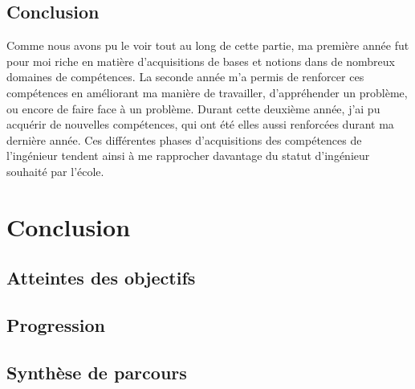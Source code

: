 \documentclass[12pt,a4paper]{report}
\begin{document}
\subsection{Conclusion}
Comme nous avons pu le voir tout au long de cette partie, ma première année fut pour moi riche en matière d'acquisitions de bases et notions dans de nombreux domaines de compétences. La seconde année m'a permis de renforcer ces compétences en améliorant ma manière de travailler, d'appréhender un problème, ou encore de faire face à un problème. Durant cette deuxième année, j'ai pu acquérir de nouvelles compétences, qui ont été elles aussi renforcées durant ma dernière année. Ces différentes phases d'acquisitions des compétences de l'ingénieur tendent ainsi à me rapprocher davantage du statut d'ingénieur souhaité par l'école. 

\newpage
\section{Conclusion}
\subsection{Atteintes des objectifs}
\subsection{Progression}
\subsection{Synthèse de parcours}
\end{document}
